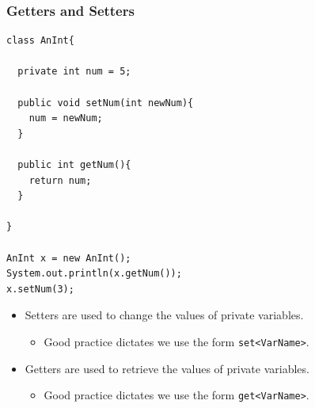 \documentclass{beamer}
\begin{document}
\begin{frame}[fragile]
    \frametitle{Getters and Setters}
    \begin{minipage}{0.59\textwidth}
        \begin{lstlisting}[basicstyle=\scriptsize, frame=trBL]
class AnInt{
    
  private int num = 5;
    
  public void setNum(int newNum){
    num = newNum;
  }

  public int getNum(){
    return num;
  }

}

AnInt x = new AnInt();
System.out.println(x.getNum()); 
x.setNum(3);
        \end{lstlisting}
    \end{minipage}
    \begin{minipage}{0.39\textwidth}
        \begin{itemize}
            \item Setters are used to change the values of private variables.
                \begin{itemize}
                    \item Good practice dictates we use the form \lstinline|set<VarName>|.
                \end{itemize}
                \pause
            \item Getters are used to retrieve the values of private variables.
                \begin{itemize}
                    \item Good practice dictates we use the form \lstinline|get<VarName>|.
                \end{itemize}
        \end{itemize}
    \end{minipage}
\end{frame}
\end{document}
